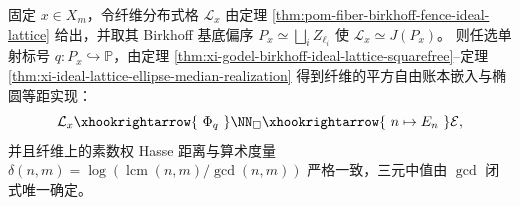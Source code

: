 \begin{corollary}\label{cor:xi-fold-fiber-ideal-lattice-prime-ledger-ellipse-isometry}
固定 \(x\in X_m\)，令纤维分布式格 \(\mathcal L_x\) 由定理 \ref{thm:pom-fiber-birkhoff-fence-ideal-lattice} 给出，并取其 Birkhoff 基底偏序
\(
P_x\simeq \bigsqcup_i Z_{\ell_i}
\)
使 \(\mathcal L_x\simeq J(P_x)\)。
则任选单射标号 \(q:P_x\hookrightarrow\mathbb P\)，由定理 \ref{thm:xi-godel-birkhoff-ideal-lattice-squarefree}--定理 \ref{thm:xi-ideal-lattice-ellipse-median-realization} 得到纤维的平方自由账本嵌入与椭圆等距实现：
\[
\mathcal L_x
\xhookrightarrow{\ \Phi_q\ }
\NN_{\square}
\xhookrightarrow{\ n\mapsto E_n\ }
\mathcal E,
\]
并且纤维上的素数权 Hasse 距离与算术度量
\(
\delta(n,m)=\log(\operatorname{lcm}(n,m)/\gcd(n,m))
\)
严格一致，三元中值由 \(\gcd\) 闭式唯一确定。
\end{corollary}

\endinput
